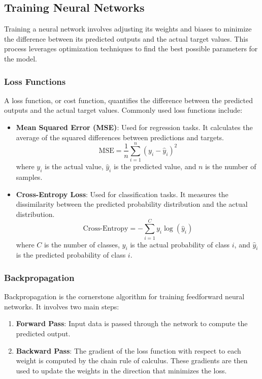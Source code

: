 \subsection{Training Neural Networks}

Training a neural network involves adjusting its weights and biases to minimize the difference between its predicted outputs and the actual target values. This process leverages optimization techniques to find the best possible parameters for the model.

\subsubsection{Loss Functions}

A loss function, or cost function, quantifies the difference between the predicted outputs and the actual target values. Commonly used loss functions include:
\begin{itemize}
    \item \textbf{Mean Squared Error (MSE)}: Used for regression tasks. It calculates the average of the squared differences between predictions and targets.
    \[ \text{MSE} = \frac{1}{n} \sum_{i=1}^{n} (y_i - \hat{y}_i)^2 \]
    where \( y_i \) is the actual value, \( \hat{y}_i \) is the predicted value, and \( n \) is the number of samples.
    
    \item \textbf{Cross-Entropy Loss}: Used for classification tasks. It measures the dissimilarity between the predicted probability distribution and the actual distribution.
    \[ \text{Cross-Entropy} = -\sum_{i=1}^{C} y_i \log(\hat{y}_i) \]
    where \( C \) is the number of classes, \( y_i \) is the actual probability of class \( i \), and \( \hat{y}_i \) is the predicted probability of class \( i \).
\end{itemize}

\subsubsection{Backpropagation}

Backpropagation is the cornerstone algorithm for training feedforward neural networks. It involves two main steps:
\begin{enumerate}
    \item \textbf{Forward Pass}: Input data is passed through the network to compute the predicted output.
    \item \textbf{Backward Pass}: The gradient of the loss function with respect to each weight is computed by the chain rule of calculus. These gradients are then used to update the weights in the direction that minimizes the loss.
\end{enumerate}

